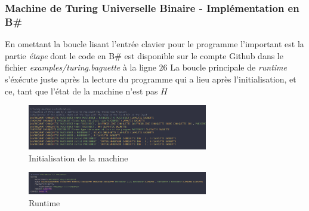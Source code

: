 \documentclass{beamer}
\newcommand{\bs}{B\# }
\begin{document}
    \begin{frame}[allowframebreaks]
        \frametitle{Machine de Turing Universelle Binaire - Implémentation en \bs }
        En omettant la boucle lisant l'entrée clavier pour le programme l'important est la partie \textit{étape} dont le code en \bs est 
        disponible sur le compte Github dans le fichier \textit{examples/turing.baguette} à la ligne $26$
        La boucle principale de \textit{runtime} s'éxécute juste après la lecture du programme qui a lieu après l'initialisation, et ce, tant que l'état de la machine n'est pas $H$
        \begin{figure}[H]
            \center 
            \includegraphics[width=0.7\textwidth]{img/init.png}
            \caption{Initialisation de la machine}
        \end{figure}
        \begin{figure}[H]
            \center
            \includegraphics[width=0.7\textwidth]{img/runtime.png}
            \caption{Runtime}
        \end{figure}
    \end{frame}
\end{document}

